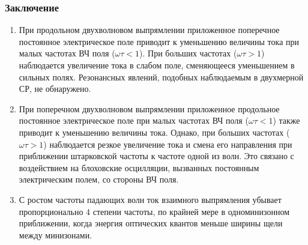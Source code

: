\documentclass[10pt,pdf,intlimits]{beamer}
\begin{document}
  \begin{frame}
      \frametitle{Заключение}
      \begin{enumerate}
        \item При продольном двухволновом выпрямлении приложенное поперечное постоянное электрическое поле приводит к уменьшению величины тока при малых частотах ВЧ поля (\(\omega\tau < 1\)). При  больших частотах (\(\omega\tau > 1\)) наблюдается увеличение тока в слабом поле, сменяющееся уменьшением в сильных полях. Резонансных явлений, подобных наблюдаемым в двухмерной СР, не обнаружено.
        \item При поперечном двухволновом выпрямлении приложенное продольное постоянное электрическое поле при малых частотах ВЧ поля (\(\omega\tau < 1\)) также приводит к уменьшению величины тока. Однако, при больших частотах (\(\omega\tau > 1\)) наблюдается резкое увеличение тока и смена его направления при приближении штарковской частоты к частоте одной из волн. Это связано с воздействием на блоховские осцилляции, вызванных постоянным электрическим полем, со стороны ВЧ поля.
        \item С ростом частоты падающих волн ток взаимного выпрямления убывает пропорционально 4 степени частоты, по крайней мере в одноминизонном приближении, когда энергия оптических квантов меньше ширины щели между минизонами.
    \end{enumerate}
  \end{frame}
\end{document}

